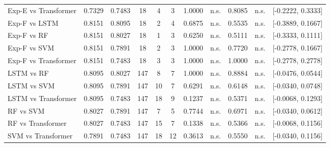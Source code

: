 \begin{table}[htbp]
{\begin{tabular}{l cc c cc cc cc c}
  Exp-E vs Transformer & 0.7329 & 0.7483 & 18 & 4 & 3 & 1.0000 & n.s. & 0.8085 & n.s. & [-0.2222, 0.3333] \\
  Exp-F vs LSTM & 0.8151 & 0.8095 & 18 & 2 & 4 & 0.6875 & n.s. & 0.5535 & n.s. & [-0.3889, 0.1667] \\
  Exp-F vs RF & 0.8151 & 0.8027 & 18 & 1 & 3 & 0.6250 & n.s. & 0.5111 & n.s. & [-0.3333, 0.1111] \\
  Exp-F vs SVM & 0.8151 & 0.7891 & 18 & 2 & 3 & 1.0000 & n.s. & 0.7720 & n.s. & [-0.2778, 0.1667] \\
  Exp-F vs Transformer & 0.8151 & 0.7483 & 18 & 3 & 3 & 1.0000 & n.s. & 1.0000 & n.s. & [-0.2778, 0.2778] \\
  LSTM vs RF & 0.8095 & 0.8027 & 147 & 8 & 7 & 1.0000 & n.s. & 0.8884 & n.s. & [-0.0476, 0.0544] \\
  LSTM vs SVM & 0.8095 & 0.7891 & 147 & 10 & 7 & 0.6291 & n.s. & 0.6148 & n.s. & [-0.0340, 0.0748] \\
  LSTM vs Transformer & 0.8095 & 0.7483 & 147 & 18 & 9 & 0.1237 & n.s. & 0.5371 & n.s. & [-0.0068, 0.1293] \\
  RF vs SVM & 0.8027 & 0.7891 & 147 & 7 & 5 & 0.7744 & n.s. & 0.6971 & n.s. & [-0.0340, 0.0612] \\
  RF vs Transformer & 0.8027 & 0.7483 & 147 & 15 & 7 & 0.1338 & n.s. & 0.5366 & n.s. & [-0.0068, 0.1156] \\
  SVM vs Transformer & 0.7891 & 0.7483 & 147 & 18 & 12 & 0.3613 & n.s. & 0.5550 & n.s. & [-0.0340, 0.1156] \\
\bottomrule
\end{tabular}%
}
\end{table}

